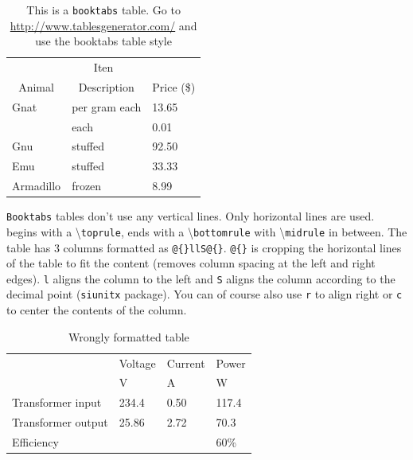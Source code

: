 \documentclass[../main.tex]{subfiles}
\begin{document}
\begin{table}[H]
\centering
\caption{This is a \texttt{booktabs} table. Go to \url{http://www.tablesgenerator.com/} and use the booktabs table style}
\label{tab:tableExample}
\begin{tabular}{lll}
\hline
\multicolumn{3}{c}{Iten}                                                  \\ \cline{1-2}
\multicolumn{1}{c}{Animal} & \multicolumn{1}{c}{Description} & Price (\$) \\ \hline
Gnat                       & per gram each                   & 13.65      \\
                           & each                            & 0.01       \\
Gnu                        & stuffed                         & 92.50      \\
Emu                        & stuffed                         & 33.33      \\
Armadillo                  & frozen                          & 8.99       \\ \hline
\end{tabular}
\end{table}

\texttt{Booktabs} tables don't use any vertical lines. Only horizontal lines are used.  begins with a \textbackslash \texttt{toprule}, ends with a \textbackslash \texttt{bottomrule} with \textbackslash \texttt{midrule} in between. The table has 3 columns formatted as \texttt{@\{\}llS@\{\}}. \texttt{@\{\}} is cropping the horizontal lines of the table to fit the content (removes column spacing at the left and right edges). \texttt{l} aligns the column to the left and \texttt{S} aligns the column according to the decimal point (\texttt{siunitx} package). You can of course also use \texttt{r} to align right or \texttt{c} to center the contents of the column. 

\begin{table}[H]
\centering
\caption{Wrongly formatted table}
\label{tab:tableExampleWrong}
\begin{tabular}{llll}
\toprule
                    & Voltage & Current   & Power   \\
                    & V       & A         & W       \\ \midrule
Transformer input   & 234.4   & 0.50      & 117.4   \\ \midrule
Transformer output  & 25.86   & 2.72      & 70.3    \\ \midrule
Efficiency          &         &           & 60\%    \\ \bottomrule
\end{tabular}
\end{table}
\end{document}
